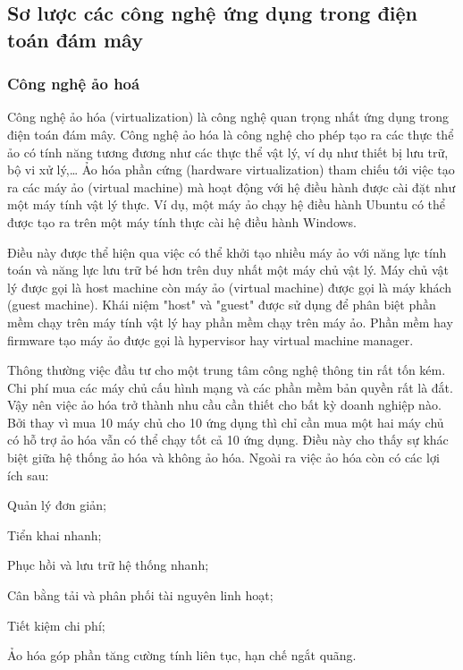 \subsection{Sơ lược các công nghệ ứng dụng trong điện toán đám mây}
\subsubsection{Công nghệ ảo hoá}
Công nghệ ảo hóa (virtualization) là công nghệ quan trọng nhất ứng dụng trong điện toán đám mây. Công nghệ ảo hóa là công nghệ cho phép tạo ra các thực thể ảo có tính năng tương đương như các thực thể vật lý, ví dụ như thiết bị lưu trữ, bộ vi xử lý,… Ảo hóa phần cứng (hardware virtualization) tham chiếu tới việc tạo ra các máy ảo (virtual machine) mà hoạt động với hệ điều hành được cài đặt như một máy tính vật lý thực. Ví dụ, một máy ảo chạy hệ điều hành Ubuntu có thể được tạo ra trên một máy tính thực cài hệ điều hành Windows.


Điều này được thể hiện qua việc có thể khởi tạo nhiều máy ảo với năng lực tính toán và năng lực lưu trữ bé hơn trên duy nhất một máy chủ vật lý. Máy chủ vật lý được gọi là host machine còn máy ảo (virtual machine) được gọi là máy khách (guest machine). Khái niệm "host" và "guest" được sử dụng để phân biệt phần mềm chạy trên máy tính vật lý hay phần mềm chạy trên máy ảo. Phần mềm hay firmware tạo máy ảo được gọi là hypervisor hay virtual machine manager.

Thông thường việc đầu tư cho một trung tâm công nghệ thông tin rất tốn kém. Chi phí mua các máy chủ cấu hình mạng và các phần mềm bản quyền rất là đắt. Vậy nên việc ảo hóa trở thành nhu cầu cần thiết cho bất kỳ doanh nghiệp nào. Bởi thay vì mua 10 máy chủ cho 10 ứng dụng thì chỉ cần mua một hai máy chủ có hỗ trợ ảo hóa vẫn có thể chạy tốt cả 10 ứng dụng. Điều này cho thấy sự khác biệt giữa hệ thống ảo hóa và không ảo hóa. Ngoài ra việc ảo hóa còn có các lợi ích sau:

\begin{myitem}
\item Quản lý đơn giản;

\item Tiển khai nhanh;

\item Phục hồi và lưu trữ hệ thống nhanh;

\item Cân bằng tải và phân phối tài nguyên linh hoạt;

\item Tiết kiệm chi phí;

\item Ảo hóa góp phần tăng cường tính liên tục, hạn chế ngắt quãng.
\end{myitem}

